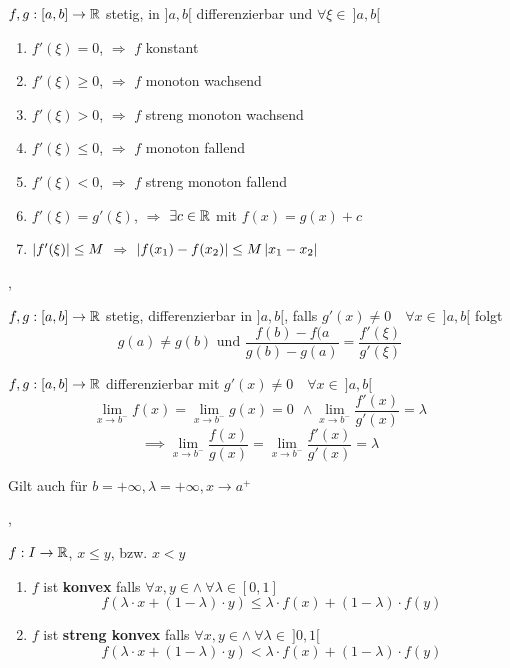\Korollar[4.2.5] $f, g :[a,b] \rightarrow \mathbb{R}$ stetig, in $]a, b[$ differenzierbar und $\forall \xi \in \ ]a, b[$
\begin{enumerate}
\item $f'(\xi) = 0 $, $\Rightarrow$ $f$ konstant 
\item $f'(\xi) \geq 0$, $\Rightarrow$ $f$ monoton wachsend
\item $f'(\xi) > 0$, $\Rightarrow$ $f$ streng monoton wachsend
\item $f'(\xi) \leq 0$, $\Rightarrow$ $f$ monoton fallend
\item $f'(\xi) < 0$, $\Rightarrow$ $f$ streng monoton fallend
\item $f'(\xi) = g'(\xi)$, $\Rightarrow$ $ \exists c \in \mathbb{R}$ mit $f(x) = g(x) + c$
\item $\left\lvert f'(\xi) \right\rvert \leq M$ $\Rightarrow$ $\left\lvert f(x_1) - f(x_2) \right\rvert \leq M \left\lvert x_1 - x_2 \right\rvert$
\end{enumerate}

\sep

\Satz[4.2.9] $f, g : [a,b] \rightarrow \mathbb{R}$ stetig, differenzierbar in $]a, b[$, falls $g'(x) \neq 0 \quad \forall x \in \ ]a, b[$  folgt 
\[g(a) \neq g(b) \text{ und } \frac{f(b) - f(a}{g(b) - g(a)} = \frac{f'(\xi)}{g'(\xi)}\]

\Satz[4.2.10 l'Hospital] $f, g : [a, b] \rightarrow \mathbb{R}$ differenzierbar mit $g'(x) \neq 0 \quad \forall x \in \ ]a, b[$ 
\[ \lim\limits_{x \rightarrow b^-} f(x) =  \lim\limits_{x \rightarrow b^-} g(x) = 0 \ \ \land \lim\limits_{x \rightarrow b^-} \frac{f'(x)}{g'(x)} = \lambda \] 
\[ \implies \lim\limits_{x \rightarrow b^-} \frac{f(x)}{g(x)} = \lim\limits_{x \rightarrow b^-} \frac{f'(x)}{g'(x)}  = \lambda \]

\Bem Gilt auch für $b = +\infty, \lambda = + \infty, x \rightarrow a^+$

\sep

\Def[4.2.13] $f : I \rightarrow \mathbb{R}$, $x \leq y$, bzw. $x < y$
\begin{enumerate}
\item $f$ ist \textbf{konvex} falls $\forall x,y \in \land \ \forall \lambda \in [0,1] $
\[ f(\lambda \cdot x + (1 - \lambda) \cdot y) \leq \lambda \cdot f(x) + (1 - \lambda) \cdot f(y) \]

\item $f$ ist \textbf{streng konvex} falls $\forall x,y \in \land \ \forall \lambda \in  \ ]0,1[ $
\[ f(\lambda \cdot x + (1 - \lambda) \cdot y) < \lambda \cdot f(x) + (1 - \lambda) \cdot f(y) \]
\end{enumerate}

